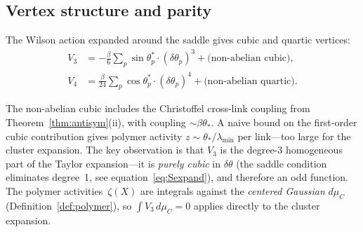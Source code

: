 \documentclass[11pt]{article}
\theoremstyle{definition}
\begin{document}
\subsection{Vertex structure and parity}

The Wilson action expanded around the saddle gives cubic and quartic
vertices:
\begin{align}
V_3&=-\frac{\beta}{6}\sum_p\sin\theta_p^*\cdot(\delta\theta_p)^3
+\text{(non-abelian cubic)},\\
V_4&=\frac{\beta}{24}\sum_p\cos\theta_p^*\cdot(\delta\theta_p)^4
+\text{(non-abelian quartic)}.
\end{align}

The non-abelian cubic includes the Christoffel cross-link coupling
from Theorem~\ref{thm:antisym}(ii), with coupling $\sim\beta\theta_*$.
A naive bound on the first-order cubic contribution gives polymer
activity $z\sim\theta_*/\lambda_{\min}$ per link---too large for the
cluster expansion.  The key observation is that $V_3$ is the
degree-3 homogeneous part of the Taylor expansion---it is \emph{purely
cubic} in $\delta\theta$ (the saddle condition eliminates degree~1,
see equation~\eqref{eq:Sexpand}), and therefore an odd function.
The polymer activities~$\zeta(X)$
are integrals against the \emph{centered Gaussian} $d\mu_C$
(Definition~\ref{def:polymer}), so
$\int V_3\,d\mu_C=0$ applies directly to the cluster expansion.
\end{document}
